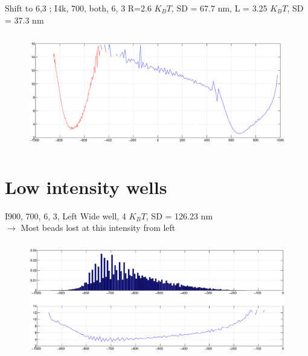 \documentclass{beamer}
\begin{document}
\begin{frame}{Shift to 6,3 ; I4k, 700, both, 6, 3} 
R=2.6 $K_BT$, SD = 67.7 nm, L = 3.25 $K_BT$, SD = 37.3 nm 
\begin{figure}
    \centering
    \includegraphics[height=5cm,width=12cm]{I4k_both_wells_700_2.eps}
    \label{fig:graph14}
\end{figure}


\end{frame}
\section{Low intensity wells}
\begin{frame}{I900, 700, 6, 3, Left} 
Wide well, 4 $K_BT$, SD = 126.23 nm \\$\rightarrow$ Most beads lost at this intensity from left
\begin{figure}
    \centering
    \includegraphics[height=5cm,width=12cm]{I900_left_1.eps}
    \label{fig:graph15}
\end{figure}


\end{frame}

\end{document}

